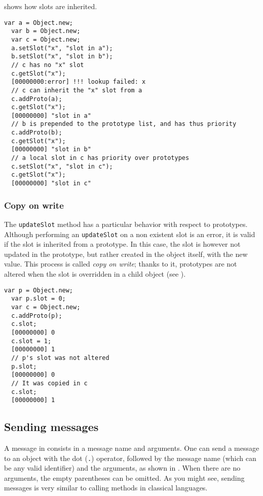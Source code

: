 \documentclass[openright,twoside,12pt]{report}
\begin{document}
 shows how slots are inherited.

\begin{lstlisting}[caption=Slots inheritance, label=lst:inheritance,
  float=\floatpos]
  var a = Object.new;
  var b = Object.new;
  var c = Object.new;
  a.setSlot("x", "slot in a");
  b.setSlot("x", "slot in b");
  // c has no "x" slot
  c.getSlot("x");
  [00000000:error] !!! lookup failed: x
  // c can inherit the "x" slot from a
  c.addProto(a);
  c.getSlot("x");
  [00000000] "slot in a"
  // b is prepended to the prototype list, and has thus priority
  c.addProto(b);
  c.getSlot("x");
  [00000000] "slot in b"
  // a local slot in c has priority over prototypes
  c.setSlot("x", "slot in c");
  c.getSlot("x");
  [00000000] "slot in c"
\end{lstlisting}

\subsubsection{Copy on write}

The \lstinline|updateSlot| method has a particular behavior with
respect to prototypes. Although performing an \lstinline|updateSlot|
on a non existent slot is an error, it is valid if the slot is
inherited from a prototype. In this case, the slot is however not
updated in the prototype, but rather created in the object itself,
with the new value. This process is called {\em copy on write}; thanks
to it, prototypes are not altered when the slot is overridden in a
child object (see ).

\begin{lstlisting}[caption=Copy on write, label=lst:copy-on-write,
  float=\floatpos]
  var p = Object.new;
  var p.slot = 0;
  var c = Object.new;
  c.addProto(p);
  c.slot;
  [00000000] 0
  c.slot = 1;
  [00000000] 1
  // p's slot was not altered
  p.slot;
  [00000000] 0
  // It was copied in c
  c.slot;
  [00000000] 1
\end{lstlisting}

\subsection{Sending messages}

A message in \us consists in a message name and arguments. One can
send a message to an object with the dot (\lstinline|.|) operator,
followed by the message name (which can be any valid identifier) and
the arguments, as shown in . When there are no
arguments, the empty parentheses can be omitted. As you might see,
sending messages is very similar to calling methods in classical
languages.
\end{document}
